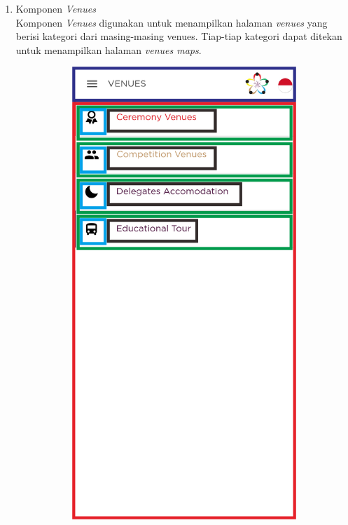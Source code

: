 \begin{enumerate}
\begin{enumerate}
\begin{itemize}
		\end{itemize}
	\end{enumerate}
	\newpage
	\item Komponen \textit{Venues} \\
	Komponen \textit{Venues} digunakan untuk menampilkan halaman \textit{venues} yang berisi kategori dari masing-masing venues. Tiap-tiap kategori dapat ditekan untuk menampilkan halaman \textit{venues maps}. 
	\begin{figure}[H]
    	\centering
     	\begin{subfigure}[b]{0.435\textwidth}
        	\centering
         	\includegraphics[scale=0.465]{Gambar/VenuePageWireframe.png}

\end{subfigure}
\end{figure}
\end{enumerate}
